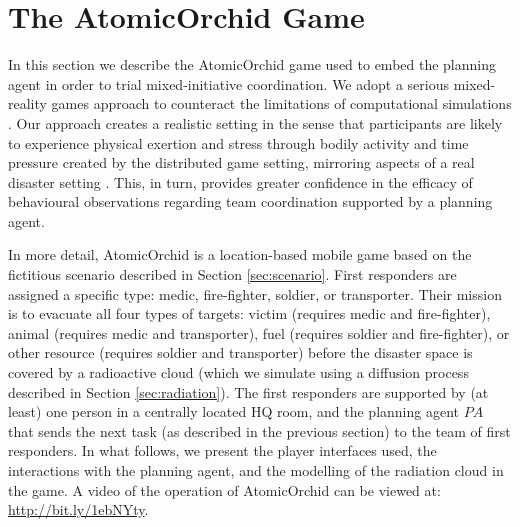 \section{The A\lowercase{tomic}O\lowercase{rchid} Game}\label{sec:atomicorchid}
\noindent In this section we describe the AtomicOrchid game used to embed the planning agent in order to trial mixed-initiative coordination. We adopt a serious mixed-reality games approach to counteract the limitations of computational simulations \cite{Fischer:etal:2012}. Our approach creates a realistic setting in the sense that participants are likely to experience physical exertion and stress through bodily activity and time pressure created by the distributed game setting, mirroring aspects of a real disaster setting \cite{paho:2001}. This, in turn, provides greater confidence in the efficacy of behavioural observations regarding team coordination supported by a planning agent.

In more detail, AtomicOrchid is a location-based mobile game based on the fictitious scenario described in Section \ref{sec:scenario}. First responders are assigned a specific type: medic, fire-fighter, soldier, or transporter. Their mission is to evacuate all four types of targets: victim (requires medic and fire-fighter), animal (requires medic and transporter), fuel (requires soldier and fire-fighter), or other resource (requires soldier and transporter) before the disaster space is covered by a radioactive cloud (which we simulate using a diffusion process described in Section \ref{sec:radiation}).  The first responders are supported by (at least) one person in a centrally located HQ room, and the planning agent $PA$ that sends the next task (as described in the previous section) to the team of first responders. In what follows, we present the player interfaces used, the interactions with the planning agent, and the modelling of the radiation cloud in the game. A video of the operation of AtomicOrchid can be viewed at: \url{http://bit.ly/1ebNYty}.






